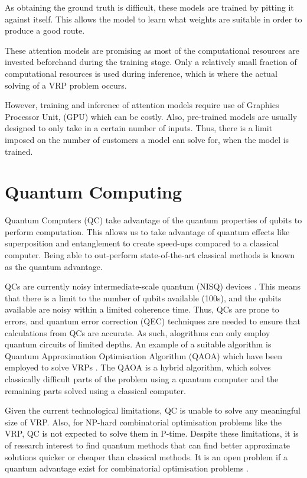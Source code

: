 As obtaining the ground truth is difficult, these models are trained by pitting it against itself. This allows the model to learn what weights are suitable in order to produce a good route. 

These attention models are promising as most of the computational resources are invested beforehand during the training stage. Only a relatively small fraction of computational resources is used during inference, which is where the actual solving of a VRP problem occurs.

However, training and inference of attention models require use of Graphics Processor Unit, (GPU) which can be costly. Also, pre-trained models are usually designed to only take in a certain number of inputs. Thus, there is a limit imposed on the number of customers a model can solve for, when the model is trained.

\section{Quantum Computing}
Quantum Computers (QC) take advantage of the quantum properties of qubits to perform computation. This allows us to take advantage of quantum effects like superposition and entanglement to create speed-ups compared to a classical computer. Being able to out-perform state-of-the-art classical methods is known as the quantum advantage.

QCs are currently noisy intermediate-scale quantum (NISQ) devices \cite{preskill_quantum_2018}. This means that there is a limit to the number of qubits available (100s), and the qubits available are noisy within a limited coherence time. Thus, QCs are prone to errors, and quantum error correction (QEC) techniques are needed to ensure that calculations from QCs are accurate. As such, alogrithms can only employ quantum circuits of limited depths. An example of a suitable algorithm is Quantum Approximation Optimisation Algorithm (QAOA) \cite{farhi_quantum_2014} which have been employed to solve VRPs \cite{azad_solving_2023}. The QAOA is a hybrid algorithm, which solves classically difficult parts of the problem using a quantum computer and the remaining parts solved using a classical computer.

Given the current technological limitations, QC is unable to solve any meaningful size of VRP. Also, for NP-hard combinatorial optimisation problems like the VRP, QC is not expected to solve them in P-time. Despite these limitations, it is of research interest to find quantum methods that can find better approximate solutions quicker or cheaper than classical methods. It is an open problem if a quantum advantage exist for combinatorial optimisation problems \cite{barak_classical_2022}.

